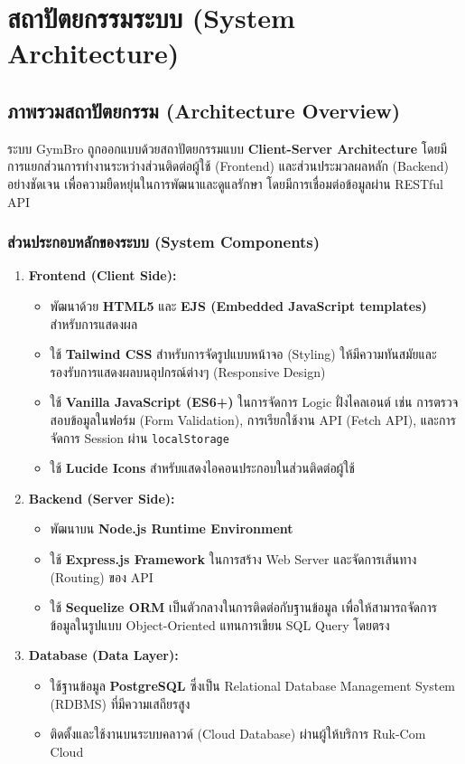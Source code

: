\section{สถาปัตยกรรมระบบ (System Architecture)}

\subsection{ภาพรวมสถาปัตยกรรม (Architecture Overview)}
ระบบ GymBro ถูกออกแบบด้วยสถาปัตยกรรมแบบ \textbf{Client-Server Architecture} โดยมีการแยกส่วนการทำงานระหว่างส่วนติดต่อผู้ใช้ (Frontend) และส่วนประมวลผลหลัก (Backend) อย่างชัดเจน เพื่อความยืดหยุ่นในการพัฒนาและดูแลรักษา โดยมีการเชื่อมต่อข้อมูลผ่าน RESTful API

\subsubsection{ส่วนประกอบหลักของระบบ (System Components)}
\begin{enumerate}
    \item \textbf{Frontend (Client Side):}
    \begin{itemize}
        \item พัฒนาด้วย \textbf{HTML5} และ \textbf{EJS (Embedded JavaScript templates)} สำหรับการแสดงผล
        \item ใช้ \textbf{Tailwind CSS} สำหรับการจัดรูปแบบหน้าจอ (Styling) ให้มีความทันสมัยและรองรับการแสดงผลบนอุปกรณ์ต่างๆ (Responsive Design)
        \item ใช้ \textbf{Vanilla JavaScript (ES6+)} ในการจัดการ Logic ฝั่งไคลเอนต์ เช่น การตรวจสอบข้อมูลในฟอร์ม (Form Validation), การเรียกใช้งาน API (Fetch API), และการจัดการ Session ผ่าน \texttt{localStorage}
        \item ใช้ \textbf{Lucide Icons} สำหรับแสดงไอคอนประกอบในส่วนติดต่อผู้ใช้
    \end{itemize}

    \item \textbf{Backend (Server Side):}
    \begin{itemize}
        \item พัฒนาบน \textbf{Node.js Runtime Environment}
        \item ใช้ \textbf{Express.js Framework} ในการสร้าง Web Server และจัดการเส้นทาง (Routing) ของ API
        \item ใช้ \textbf{Sequelize ORM} เป็นตัวกลางในการติดต่อกับฐานข้อมูล เพื่อให้สามารถจัดการข้อมูลในรูปแบบ Object-Oriented แทนการเขียน SQL Query โดยตรง
    \end{itemize}

    \item \textbf{Database (Data Layer):}
    \begin{itemize}
        \item ใช้ฐานข้อมูล \textbf{PostgreSQL} ซึ่งเป็น Relational Database Management System (RDBMS) ที่มีความเสถียรสูง
        \item ติดตั้งและใช้งานบนระบบคลาวด์ (Cloud Database) ผ่านผู้ให้บริการ Ruk-Com Cloud
    \end{itemize}
\end{enumerate}

